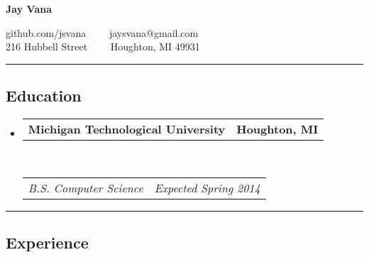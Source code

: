 \documentclass[10pt,letterpaper]{article}
\makeatletter
\newcommand{\headerrow}[2]
{\begin{tabular*}{\linewidth}{l@{\extracolsep{\fill}}r}
	#1 &
	#2 \\
\end{tabular*}}
\makeatother
\begin{document}
\begin{center}
{\LARGE \textbf{Jay Vana}}

github.com/jsvana\ \ \textbullet
\ \ jaysvana@gmail.com\\
216 Hubbell Street\ \ \textbullet
\ \ Houghton, MI 49931
\end{center}

\hrule
\vspace{-0.4em}
\subsection*{Education}

\begin{itemize}
	\parskip=0.1em

	\item
	\headerrow
		{\textbf{Michigan Technological University}}
		{\textbf{Houghton, MI}}
	\\
	\headerrow
		{\emph{B.S. Computer Science}}
		{\emph{Expected Spring 2014}}

\end{itemize}

\hrule
\vspace{-0.4em}
\subsection*{Experience}
\end{document}
